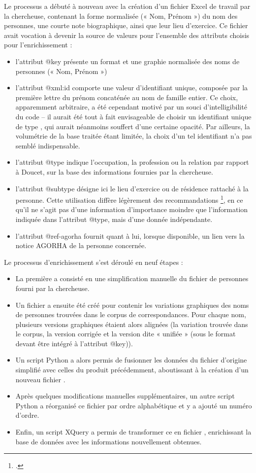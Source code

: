 Le processus a débuté à nouveau avec la création d'un fichier Excel de travail par la chercheuse, contenant la forme normalisée (« Nom, Prénom ») du nom des personnes, une courte note biographique, ainsi que leur lieu d'exercice. Ce fichier avait vocation à devenir la source de valeurs pour l’ensemble des attributs choisis pour l’enrichissement : 
\begin{itemize}[label=--]
    \item l’attribut @key présente un format et une graphie normalisée des noms de personnes (« Nom, Prénom »)
    \item l’attribut @xml:id comporte une valeur d’identifiant unique, composée par la première lettre du prénom concaténée au nom de famille entier. Ce choix, apparemment arbitraire, a été cependant motivé par un souci d’intelligibilité du code – il aurait été tout à fait envisageable de choisir un identifiant unique de type \uuid, qui aurait néanmoins souffert d’une certaine opacité. Par ailleurs, la volumétrie de la base traitée étant limitée, la choix d’un tel identifiant n’a pas semblé indispensable.
    \item l’attribut @type indique l’occupation, la profession ou la relation par rapport à Doucet, sur la base des informations fournies par la chercheuse.
    \item l’attribut @subtype désigne ici le lieu d’exercice ou de résidence rattaché à la personne. Cette utilisation diffère légèrement des recommandations \tei\footcite{tei_consortium_tei_nodate}, en ce qu’il ne s’agit pas d’une information d’importance moindre que l’information indiquée dans l’attribut @type, mais d’une donnée indépendante.
    \item l’attribut @ref-agorha fournit quant à lui, lorsque disponible, un lien \ark vers la notice AGORHA de la personne concernée. 
\end{itemize}

Le processus d'enrichissement s'est déroulé en neuf étapes :
\begin{itemize}
    \item La première a consisté en une simplification manuelle du fichier de personnes fourni par la chercheuse.
    \item Un fichier \csv a ensuite été créé pour contenir les variations graphiques des noms de personnes trouvées dans le corpus de correspondances. Pour chaque nom, plusieurs versions graphiques étaient alors alignées (la variation trouvée dans le corpus, la version corrigée et la version dite « unifiée » (sous le format devant être intégré à l’attribut @key)).
    \item Un script Python a alors permis de fusionner les données du fichier d'origine simplifié avec celles du \csv produit précédemment, aboutissant à la création d'un nouveau fichier \csv.
    \item Après quelques modifications manuelles supplémentaires, un autre script Python a réorganisé ce fichier par ordre alphabétique et y a ajouté un numéro d'ordre.
    \item Enfin, un script XQuery a permis de transformer ce \csv en fichier \xml, enrichissant la base de données \tei avec les informations nouvellement obtenues.   
\end{itemize}
